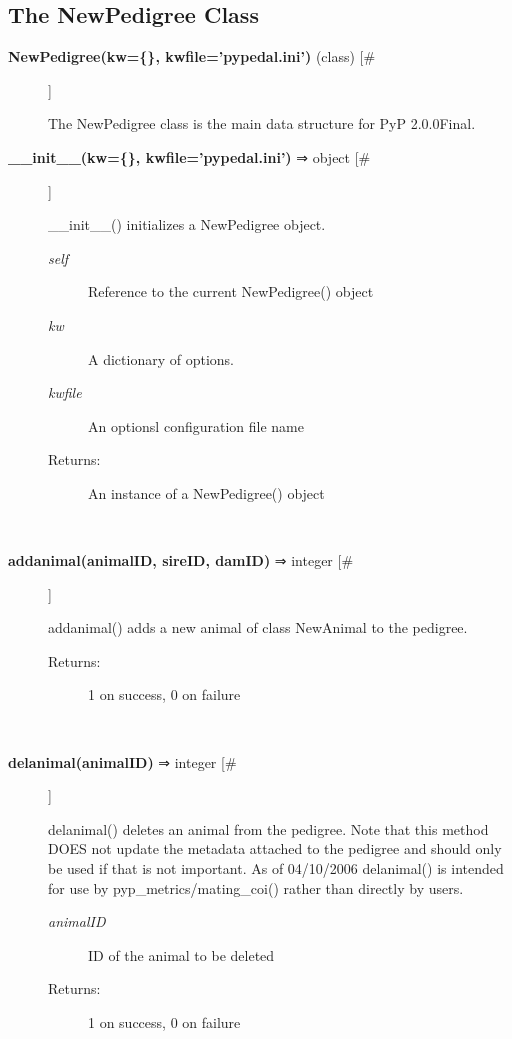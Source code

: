 \documentclass{article}
\begin{document}
\subsection*{The NewPedigree Class}
\begin{description}
\item[\textbf{NewPedigree(kw=\{\}, kwfile='pypedal.ini')} (class) [\#]
]
\par The NewPedigree class is the main data structure for PyP 2.0.0Final.

\item[\textbf{\_\_init\_\_(kw=\{\}, kwfile='pypedal.ini')} ⇒ object [\#]
]
\par \_\_init\_\_() initializes a NewPedigree object.
\begin{description}
\item[\textit{self}
]
Reference to the current NewPedigree() object
\item[\textit{kw}
]
A dictionary of options.
\item[\textit{kwfile}
]
An optionsl configuration file name
\item[Returns:
]
An instance of a NewPedigree() object
\end{description}\\

\item[\textbf{addanimal(animalID, sireID, damID)} ⇒ integer [\#]
]
\par addanimal() adds a new animal of class NewAnimal to the pedigree.
\begin{description}
\item[\textit{}
]

\item[Returns:
]
1 on success, 0 on failure
\end{description}\\

\item[\textbf{delanimal(animalID)} ⇒ integer [\#]
]
\par delanimal() deletes an animal from the pedigree. Note that this
method DOES not update the metadata attached to the pedigree
and should only be used if that is not important. As of 04/10/2006
delanimal() is intended for use by pyp\_metrics/mating\_coi() rather
than directly by users.
\begin{description}
\item[\textit{animalID}
]
ID of the animal to be deleted
\item[Returns:
]
1 on success, 0 on failure
\end{description}\\


\end{description}
\end{document}
